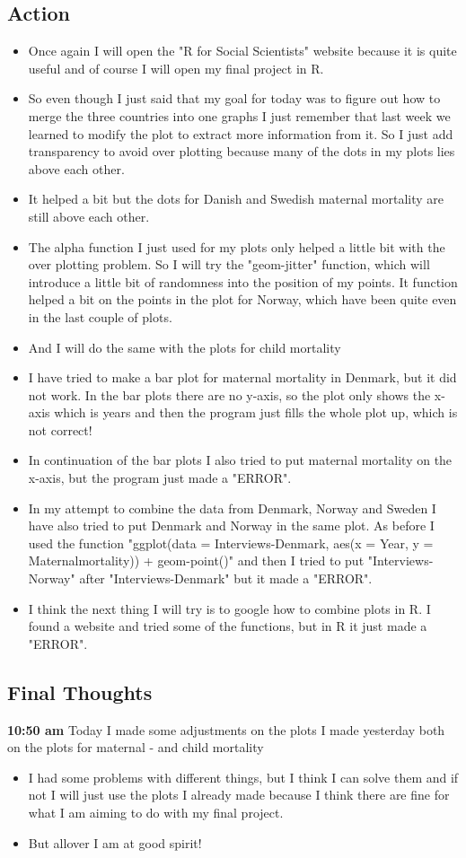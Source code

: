 \documentclass{article}
\begin{document}
\subsection{Action}
\begin{itemize}
    \item Once again I will open the "R for Social Scientists" website because it is quite useful and of course I will open my final project in R. 
    \item So even though I just said that my goal for today was to figure out how to merge the three countries into one graphs I just remember that last week we learned to modify the plot to extract more information from it. So I just add transparency to avoid over plotting because many of the dots in my plots lies above each other.  
    \item It helped a bit but the dots for Danish and Swedish maternal mortality are still above each other. 
     \item The alpha function I just used for my plots only helped a little bit with the over plotting problem. So I will try the "geom-jitter" function, which will introduce a little bit of randomness into the position of my points. It function helped a bit on the points in the plot for Norway, which have been quite even in the last couple of plots. 
     \item And I will do the same with the plots for child mortality
    \item I have tried to make a bar plot for maternal mortality in Denmark, but it did not work. In the bar plots there are no y-axis, so the plot only shows the x-axis which is years and then the program just fills the whole plot up, which is not correct! 
    \item In continuation of the bar plots I also tried to put maternal mortality on the x-axis, but the program just made a "ERROR". 
    \item In my attempt to combine the data from Denmark, Norway and Sweden I have also tried to put Denmark and Norway in the same plot. As before I used the function "ggplot(data = Interviews-Denmark, aes(x = Year, y = Maternalmortality)) + geom-point()" and then I tried to put "Interviews-Norway" after "Interviews-Denmark" but it made a "ERROR". 
    \item I think the next thing I will try is to google how to combine plots in R. I found a website and tried some of the functions, but in R it just made a "ERROR". 
\end{itemize}
\subsection{Final Thoughts}
\textbf{10:50 am} Today I made some adjustments on the plots I made yesterday both on the plots for maternal - and child mortality  
\begin{itemize}
    \item I had some problems with different things, but I think I can solve them and if not I will just use the plots I already made because I think there are fine for what I am aiming to do with my final project. 
    \item But allover I am at good spirit!  
\end{itemize}\bigskip
\end{document}
